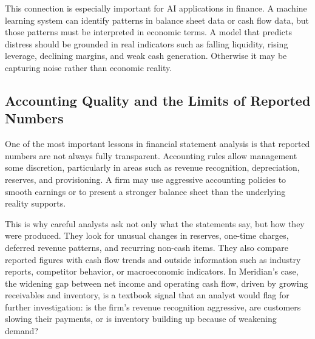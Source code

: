 \documentclass[../ai_in_finance]{subfiles}
\begin{document}
This connection is especially important for AI applications in finance. A machine learning system can identify patterns in balance sheet data or cash flow data, but those patterns must be interpreted in economic terms. A model that predicts distress should be grounded in real indicators such as falling liquidity, rising leverage, declining margins, and weak cash generation. Otherwise it may be capturing noise rather than economic reality.

\subsection{Accounting Quality and the Limits of Reported Numbers}

One of the most important lessons in financial statement analysis is that reported numbers are not always fully transparent. Accounting rules allow management some discretion, particularly in areas such as revenue recognition, depreciation, reserves, and provisioning. A firm may use aggressive accounting policies to smooth earnings or to present a stronger balance sheet than the underlying reality supports.

This is why careful analysts ask not only what the statements say, but how they were produced. They look for unusual changes in reserves, one-time charges, deferred revenue patterns, and recurring non-cash items. They also compare reported figures with cash flow trends and outside information such as industry reports, competitor behavior, or macroeconomic indicators. In Meridian's case, the widening gap between net income and operating cash flow, driven by growing receivables and inventory, is a textbook signal that an analyst would flag for further investigation: is the firm's revenue recognition aggressive, are customers slowing their payments, or is inventory building up because of weakening demand?
\end{document}
